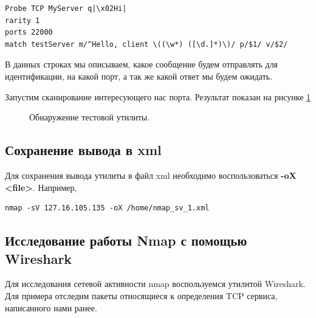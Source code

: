 \documentclass[10pt,a4paper]{report}
\begin{document}
\begin{verbatim}
Probe TCP MyServer q|\x02Hi|
rarity 1
ports 22000
match testServer m/^Hello, client \((\w*) ([\d.]*)\)/ p/$1/ v/$2/
\end{verbatim}

В данных строках мы описываем, какое сообщение будем отправлять для идентификации, на какой порт, а так же какой ответ мы будем ожидать.

Запустим сканирование интересующего нас порта. Результат показан на рисунке \ref{Img:7}

\begin{figure}[h!]	
	\caption{Обнаружение тестовой утилиты.}
	\label{Img:7}
\end{figure}

\subsection{Сохранение вывода в xml}

Для сохранения вывода утилиты в файл xml необходимо воспользоваться \textbf{-oX <file>}. Например,

\begin{verbatim}
nmap -sV 127.16.105.135 -oX /home/nmap_sv_1.xml
\end{verbatim}

\subsection{Исследование работы Nmap с помощью Wireshark}
\label{wireshark}

Для исследования сетевой активности nmap воспользуемся утилитой Wireshark. Для примера отследим пакеты относящиеся к определения TCP сервиса, написанного нами ранее.
\end{document}

